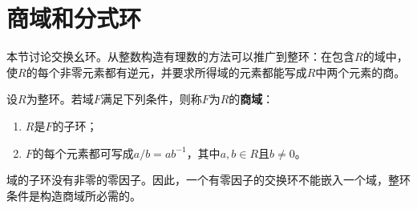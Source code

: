\section{商域和分式环}

本节讨论交换幺环。从整数构造有理数的方法可以推广到整环：在包含$R$的域中，使$R$的每个非零元素都有逆元，并要求所得域的元素都能写成$R$中两个元素的商。

\begin{definition}
设$R$为整环。若域$F$满足下列条件，则称$F$为$R$的\textbf{商域}：
\begin{enumerate}
\item $R$是$F$的子环；
\item $F$的每个元素都可写成$a/b=ab^{-1}$，其中$a,b\in R$且$b\ne0$。
\end{enumerate}
\end{definition}

域的子环没有非零的零因子。因此，一个有零因子的交换环不能嵌入一个域，整环条件是构造商域所必需的。

